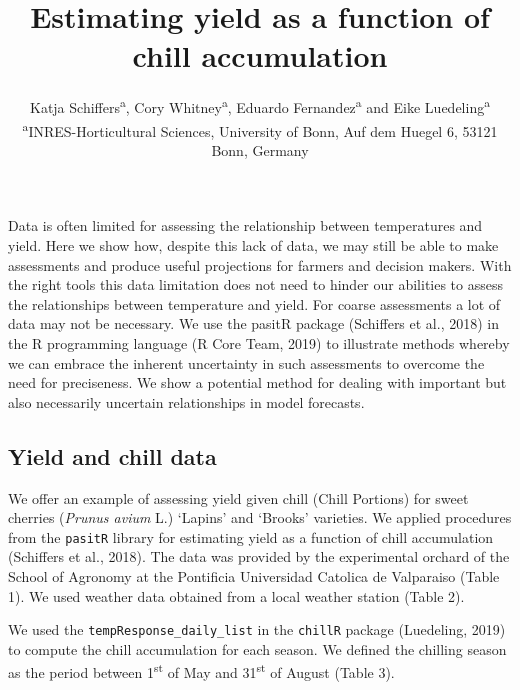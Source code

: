 \documentclass[]{article}
\title{Estimating yield as a function of chill accumulation}
\author{Katja Schiffers\textsuperscript{a}, Cory Whitney\textsuperscript{a},
Eduardo Fernandez\textsuperscript{a} and Eike
Luedeling\textsuperscript{a} \textsuperscript{a}INRES-Horticultural
Sciences, University of Bonn, Auf dem Huegel 6, 53121 Bonn, Germany}
\date{}
\begin{document}
\maketitle

Data is often limited for assessing the relationship between
temperatures and yield. Here we show how, despite this lack of data, we
may still be able to make assessments and produce useful projections for
farmers and decision makers. With the right tools this data limitation
does not need to hinder our abilities to assess the relationships
between temperature and yield. For coarse assessments a lot of data may
not be necessary. We use the pasitR package (Schiffers et al., 2018) in
the R programming language (R Core Team, 2019) to illustrate methods
whereby we can embrace the inherent uncertainty in such assessments to
overcome the need for preciseness. We show a potential method for
dealing with important but also necessarily uncertain relationships in
model forecasts.

\hypertarget{yield-and-chill-data}{%
\subsection{Yield and chill data}\label{yield-and-chill-data}}

We offer an example of assessing yield given chill (Chill Portions) for
sweet cherries (\emph{Prunus avium} L.) `Lapins' and `Brooks' varieties.
We applied procedures from the \texttt{pasitR} library for estimating
yield as a function of chill accumulation (Schiffers et al., 2018). The
data was provided by the experimental orchard of the School of Agronomy
at the Pontificia Universidad Catolica de Valparaiso (Table 1). We used
weather data obtained from a local weather station (Table 2).

We used the \texttt{tempResponse\_daily\_list} in the \texttt{chillR}
package (Luedeling, 2019) to compute the chill accumulation for each
season. We defined the chilling season as the period between
1\textsuperscript{st} of May and 31\textsuperscript{st} of August (Table
3).
\end{document}
